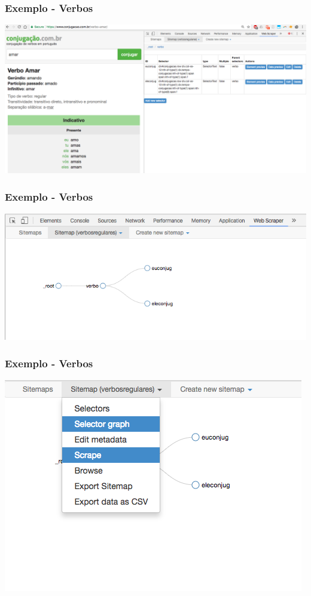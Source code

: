 \documentclass{beamer}
\begin{document}
\begin{frame}
\frametitle{Exemplo - Verbos}
\includegraphics[width=\textwidth]{Screen_Shot_2017-10-05_at_22_43_03.png}
\end{frame}

\begin{frame}
\frametitle{Exemplo - Verbos}
\includegraphics[width=\textwidth]{Screen_Shot_2017-10-05_at_22_43_19.png}
\end{frame}

\begin{frame}
\frametitle{Exemplo - Verbos}
\includegraphics[width=\textwidth]{Screen_Shot_2017-10-05_at_22_54_07.png}
\end{frame}
\end{document}
